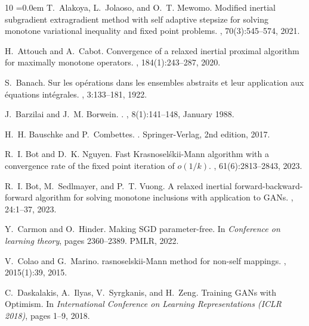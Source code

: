 \documentclass{article}
\theoremstyle{plain}
\theoremstyle{definition}
\newcommand{\0}{\boldsymbol{0}}
\begin{document}
\begin{thebibliography}{10}
\itemsep=0.0em
T.~Alakoya, L.~Jolaoso, and O.~T. Mewomo.
\newblock Modified inertial subgradient extragradient method with self adaptive
  stepsize for solving monotone variational inequality and fixed point
  problems.
, 70(3):545--574, 2021.

H.~Attouch and A.~Cabot.
\newblock Convergence of a relaxed inertial proximal algorithm for maximally
  monotone operators.
, 184(1):243--287, 2020.

S.~Banach.
\newblock Sur les opérations dans les ensembles abstraits et leur application
  aux équations intégrales.
, 3:133--181, 1922.

J.~Barzilai and J.~M. Borwein.
.
, 8(1):141--148, January 1988.

H.~H. Bauschke and P.~Combettes.
.
\newblock Springer-Verlag, 2nd edition, 2017.

R.~I. Bot and D.~K. Nguyen.
\newblock Fast {K}rasnosel\'skii-{M}ann algorithm with a convergence rate of
  the fixed point iteration of $o(1/k)$.
, 61(6):2813--2843, 2023.

R.~I. Bot, M.~Sedlmayer, and P.~T. Vuong.
\newblock A relaxed inertial forward-backward-forward algorithm for solving
  monotone inclusions with application to {GANs}.
, 24:1--37, 2023.

Y.~Carmon and O.~Hinder.
\newblock Making {SGD} parameter-free.
\newblock In {\em Conference on learning theory}, pages 2360--2389. PMLR, 2022.

V.~Colao and G.~Marino.
rasnoselskii-{M}ann method for non-self mappings.
, 2015(1):39, 2015.

C.~Daskalakis, A.~Ilyas, V.~Syrgkanis, and H.~Zeng.
\newblock Training {GANs} with {O}ptimism.
\newblock In {\em International Conference on Learning Representations (ICLR
  2018)}, pages 1--9, 2018.


\end{thebibliography}
\end{document}
